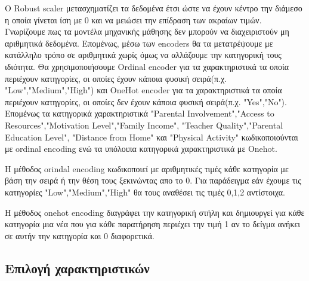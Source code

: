 \documentclass[12pt]{article}
\begin{document}
\noindent Ο Robust scaler μετασχηματίζει τα δεδομένα έτσι ώστε να έχουν κέντρο την διάμεσο η οποία γίνεται ίση με 0 και να μειώσει την επίδραση των ακραίων τιμών.\\

\noindent Γνωρίζουμε πως τα μοντέλα μηχανικής μάθησης δεν μπορούν να διαχειριστούν μη αριθμητικά δεδομένα. Επομένως, μέσω των encoders θα τα μετατρέψουμε με κατάλληλο τρόπο σε αριθμητικά χωρίς όμως να αλλάζουμε την κατηγορική τους ιδιότητα. Θα χρησιμοποιήσουμε Ordinal encoder για τα χαρακτηριστικά τα οποία περιέχουν κατηγορίες, οι οποίες έχουν κάποια φυσική σειρά(π.χ. "Low","Medium","High") και OneHot encoder για τα χαρακτηριστικά τα οποία περιέχουν κατηγορίες, οι οποίες δεν έχουν κάποια φυσική σειρά(π.χ. "Yes","No"). Επομένως τα κατηγορικά χαρακτηριστικά "Parental Involvement","Access to Resources","Motivation Level","Family Income", "Teacher Quality","Parental Education Level", "Distance from Home" και "Physical Activity" κωδικοποιούνται με ordinal encoding ενώ τα υπόλοιπα κατηγορικά χαρακτηριστικά με Onehot.

Η μέθοδος orindal encoding κωδικοποιεί με αριθμητικές τιμές κάθε κατηγορία με βάση την σειρά ή την θέση τους ξεκινώντας απο το 0. Για παράδειγμα εάν έχουμε τις κατηγορίες "Low","Medium","High" θα τους αναθέσει τις τιμές 0,1,2 αντίστοιχα. 

Η μέθοδος onehot encoding διαγράφει την κατηγορική στήλη και δημιουργεί για κάθε κατηγορία μια νέα που για κάθε παρατήρηση περιέχει την τιμή 1 αν το δείγμα ανήκει σε αυτήν την κατηγορία και 0 διαφορετικά. 
\subsection{Επιλογή χαρακτηριστικών}
\end{document}

